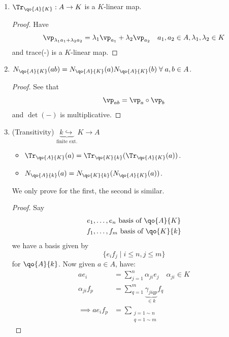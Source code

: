 \begin{proposition}
	\leavevmode
	\begin{enumerate}
		\item \( \Tr_{\qo{A}{K}}: A \to K \) is a \( K \)-linear map.
		      \begin{proof}
			      Have
			      \[
				      \vp_{\lambda_1 a_1 + \lambda _2 a_2} = \lambda _1 \vp_{a_1} + \lambda _2 \vp_{a_2} \quad
				      a_1,a_2 \in A, \lambda _1, \lambda _2 \in K
			      \]
			      and trace(-) is a \( K \)-linear map.
		      \end{proof}
		\item \( N_{\qo{A}{K}}(ab) = N_{\qo{A}{K}}(a) N_{\qo{A}{K}}(b) \; \forall \; a,b \in A \).
		      \begin{proof}
			      See that
			      \[
				      \vp_{ab} = \vp_a \circ \vp_b
			      \]
			      and \( \det(-) \) is multiplicative.
		      \end{proof}
		\item (Transitivity) \( \underbrace{k\hookrightarrow }_{\text{finite ext.}} K \to A \)
		      \begin{itemize}
			      \item \( \Tr_{\qo{A}{K}}(a) = \Tr_{\qo{K}{k}}(\Tr_{\qo{A}{K}} (a)) \).
			      \item \( N_{\qo{A}{k}}(a) = N_{\qo{K}{k}}(N_{\qo{A}{K}}(a)) \).
		      \end{itemize}
		      We only prove for the first, the second is similar.
		      \begin{proof}
			      Say
			      \[
				      \begin{aligned}
					      e_1, & \ldots, e_n \text{ basis of } \qo{A}{K} \\
					      f_1, & \ldots, f_m \text{ basis of } \qo{K}{k}
				      \end{aligned}
			      \]
			      we have a basis given by
			      \[
				      \{e_i f_j \; | \; i \leq n, j \leq m\}
			      \]
			      for \( \qo{A}{k} \). Now given \( a\in A \), have:
			      \[
				      \begin{aligned}
					      a e_i                                         & = \sum_{j=1}^n \alpha_{ji} e_j \quad \alpha_{ji} \in K \\
					      \alpha_{ji} f_p                               & = \sum_{q=1}^m \underbrace{\gamma_{jiqp}}_{\in k} f_q  \\
					      \implies a e_i f_p                            & = \sum_{\substack{j = 1 \sim n                         \\ q = 1\sim m}}

\end{aligned}\]
\end{proof}
\end{enumerate}
\end{proposition}
